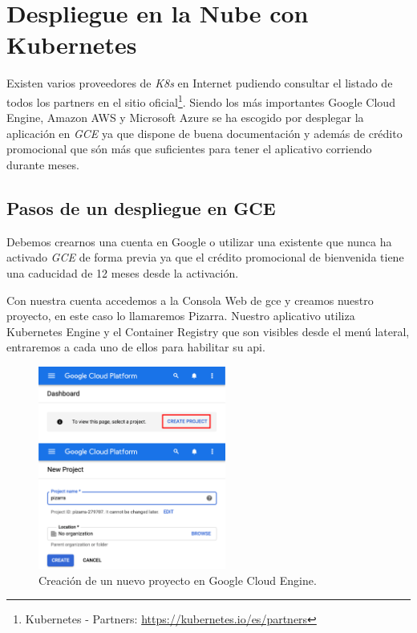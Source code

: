 \documentclass[11pt,spanish,listoffigures,listoftables]{tfgetsinf}
\begin{document}
\section{Despliegue en la Nube con Kubernetes}

Existen varios proveedores de \textit{K8s} en Internet pudiendo consultar el listado de todos los partners en el sitio oficial\footnote{Kubernetes - Partners: \url{https://kubernetes.io/es/partners}}. Siendo los más importantes Google Cloud Engine, Amazon AWS y Microsoft Azure se ha escogido por desplegar la aplicación en \textit{GCE} ya que dispone de buena documentación y además  de crédito promocional que són más que suficientes para tener el aplicativo corriendo durante meses.

\subsection{Pasos de un despliegue en GCE}

Debemos crearnos una cuenta en Google o utilizar una existente que nunca ha activado \textit{GCE} de forma previa ya que el crédito promocional de bienvenida tiene una caducidad de 12 meses desde la activación.

Con nuestra cuenta accedemos a la Consola Web de \acrshort{gce} y creamos nuestro proyecto, en este caso lo llamaremos Pizarra. Nuestro aplicativo utiliza Kubernetes Engine y el Container Registry que son visibles desde el menú lateral, entraremos a cada uno de ellos para habilitar su \acrshort{api}.

\begin{figure}[ht]
	\centering
	\includegraphics[width=0.55\textwidth]{img/gce-new-project}
	\caption[nuevo proyecto en GCE]{Creación de un nuevo proyecto en Google Cloud Engine.}
	\label{figura:gce-new-project}
\end{figure}
\end{document}
